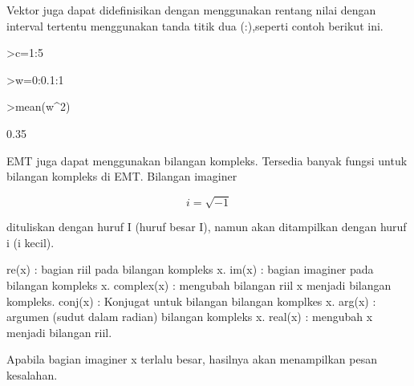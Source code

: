 \documentclass[a4paper,10pt]{article}
\begin{document}
\begin{eulernotebook}
\begin{eulercomment}
\begin{eulercomment}
\begin{eulercomment}
\begin{eulercomment}
\begin{eulercomment}
Vektor juga dapat didefinisikan dengan menggunakan rentang nilai dengan interval
tertentu menggunakan tanda titik dua (:),seperti contoh berikut ini.
\end{eulercomment}
\begin{eulerprompt}
>c=1:5
\end{eulerprompt}
\begin{euleroutput}
  [1,  2,  3,  4,  5]
\end{euleroutput}
\begin{eulerprompt}
>w=0:0.1:1
\end{eulerprompt}
\begin{euleroutput}
  [0,  0.1,  0.2,  0.3,  0.4,  0.5,  0.6,  0.7,  0.8,  0.9,  1]
\end{euleroutput}
\begin{eulerprompt}
>mean(w^2)
\end{eulerprompt}
\begin{euleroutput}
  0.35
\end{euleroutput}
\begin{eulercomment}
EMT juga dapat menggunakan bilangan kompleks. Tersedia banyak fungsi untuk
bilangan kompleks di EMT. Bilangan imaginer

\end{eulercomment}
\begin{eulerformula}
\[
i = \sqrt{-1}
\]
\end{eulerformula}
\begin{eulercomment}
dituliskan dengan huruf I (huruf besar I), namun akan ditampilkan dengan huruf i
(i kecil).

\end{eulercomment}
\begin{eulerttcomment}
  re(x) : bagian riil pada bilangan kompleks x.
  im(x) : bagian imaginer pada bilangan kompleks x.
  complex(x) : mengubah bilangan riil x menjadi bilangan kompleks.
  conj(x) : Konjugat untuk bilangan bilangan komplkes x.
  arg(x) : argumen (sudut dalam radian) bilangan kompleks x.
  real(x) : mengubah x menjadi bilangan riil.
\end{eulerttcomment}
\begin{eulercomment}

Apabila bagian imaginer x terlalu besar, hasilnya akan menampilkan pesan
kesalahan.


\end{eulercomment}
\end{eulercomment}
\end{eulercomment}
\end{eulercomment}
\end{eulercomment}
\end{eulernotebook}
\end{document}
